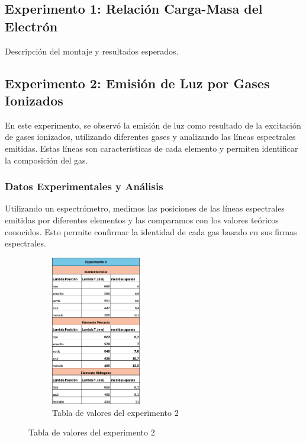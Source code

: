 \subsection{Experimento 1: Relación Carga-Masa del Electrón}
Descripción del montaje y resultados esperados.

\subsection{Experimento 2: Emisión de Luz por Gases Ionizados}

En este experimento, se observó la emisión de luz como resultado de la excitación de gases ionizados, utilizando diferentes gases y analizando las líneas espectrales emitidas. Estas líneas son características de cada elemento y permiten identificar la composición del gas.

\subsubsection{Datos Experimentales y Análisis}
Utilizando un espectrómetro, medimos las posiciones de las líneas espectrales emitidas por diferentes elementos y las comparamos con los valores teóricos conocidos. Esto permite confirmar la identidad de cada gas basado en sus firmas espectrales.

\begin{figure}[H]
  \centering
  \begin{subfigure}[b]{\textwidth}
      \centering
      \includegraphics[width=0.43\textwidth]{Figures/1. Content/tabla-experimento-2.png}
      \caption{Tabla de valores del experimento 2}
      \label{fig: Tabla experimento 2}
  \end{subfigure}
  \hfill
\end{figure}

